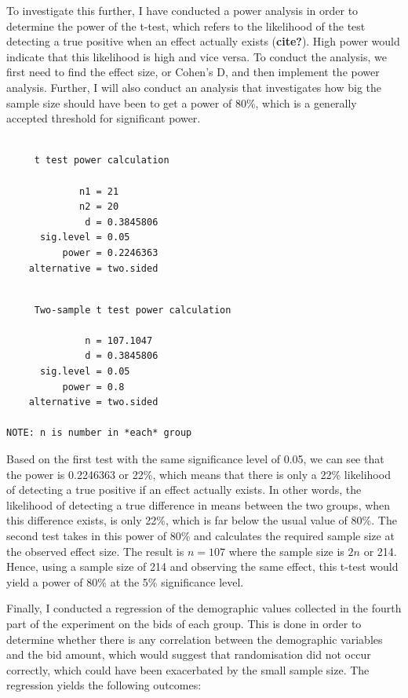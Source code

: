 \documentclass[
]{report}
\begin{document}
To investigate this further, I have conducted a power analysis in order
to determine the power of the t-test, which refers to the likelihood of
the test detecting a true positive when an effect actually exists
(\textbf{cite?}). High power would indicate that this likelihood is high
and vice versa. To conduct the analysis, we first need to find the
effect size, or Cohen's D, and then implement the power analysis.
Further, I will also conduct an analysis that investigates how big the
sample size should have been to get a power of 80\%, which is a
generally accepted threshold for significant power.

\begin{verbatim}

     t test power calculation 

             n1 = 21
             n2 = 20
              d = 0.3845806
      sig.level = 0.05
          power = 0.2246363
    alternative = two.sided
\end{verbatim}

\begin{verbatim}

     Two-sample t test power calculation 

              n = 107.1047
              d = 0.3845806
      sig.level = 0.05
          power = 0.8
    alternative = two.sided

NOTE: n is number in *each* group
\end{verbatim}

Based on the first test with the same significance level of 0.05, we can
see that the power is 0.2246363 or 22\%, which means that there is only
a 22\% likelihood of detecting a true positive if an effect actually
exists. In other words, the likelihood of detecting a true difference in
means between the two groups, when this difference exists, is only 22\%,
which is far below the usual value of 80\%. The second test takes in
this power of 80\% and calculates the required sample size at the
observed effect size. The result is \(n = 107\) where the sample size is
\(2n\) or 214. Hence, using a sample size of 214 and observing the same
effect, this t-test would yield a power of 80\% at the 5\% significance
level.

Finally, I conducted a regression of the demographic values collected in
the fourth part of the experiment on the bids of each group. This is
done in order to determine whether there is any correlation between the
demographic variables and the bid amount, which would suggest that
randomisation did not occur correctly, which could have been exacerbated
by the small sample size. The regression yields the following outcomes:
\end{document}

